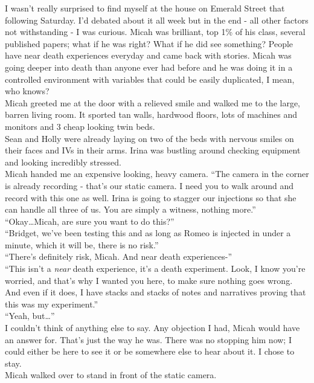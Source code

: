 \documentclass[a5paper]{scrartcl}
\begin{document}
I wasn't really surprised to find myself at the house on Emerald Street that following Saturday. I'd debated about it all week but in the end - all other factors not withstanding - I was curious. Micah was brilliant, top 1\% of his class, several published papers; what if he was right? What if he did see something? People have near death experiences everyday and came back with stories. Micah was going deeper into death than anyone ever had before and he was doing it in a controlled environment with variables that could be easily duplicated, I mean, who knows?\\
Micah greeted me at the door with a relieved smile and walked me to the large, barren living room. It sported tan walls, hardwood floors, lots of machines and monitors and 3 cheap looking twin beds.\\
Sean and Holly were already laying on two of the beds with nervous smiles on their faces and IVs in their arms. Irina was bustling around checking equipment and looking incredibly stressed.\\
Micah handed me an expensive looking, heavy camera. \enquote{The camera in the corner is already recording - that's our static camera. I need you to walk around and record with this one as well. Irina is going to stagger our injections so that she can handle all three of us. You are simply a witness, nothing more.}\\
\enquote{Okay\dots Micah, are sure you want to do this?}\\
\enquote{Bridget, we've been testing this and as long as Romeo is injected in under a minute, which it will be, there is no risk.}\\
\enquote{There's definitely risk, Micah. And near death experiences-}\\
\enquote{This isn't a \textit{near} death experience, it's a death experiment. Look, I know you're worried, and that's why I wanted you here, to make sure nothing goes wrong. And even if it does, I have stacks and stacks of notes and narratives proving that this was my experiment.}\\
\enquote{Yeah, but\dots}\\
I couldn't think of anything else to say. Any objection I had, Micah would have an answer for. That's just the way he was. There was no stopping him now; I could either be here to see it or be somewhere else to hear about it. I chose to stay.\\
Micah walked over to stand in front of the static camera.\\
\end{document}
